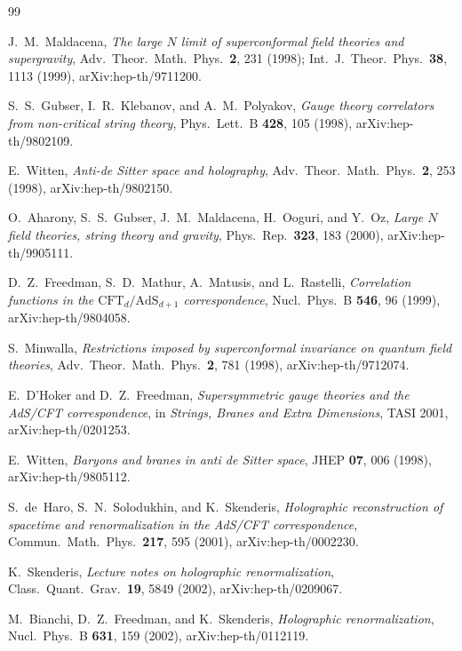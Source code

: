 \documentclass[
  aps,
  prd,
  preprint,
  groupedaddress,
  nofootinbib,
  longbibliography
]{revtex4-2}
\theoremstyle{remark}
\newcommand{\AdS}{\mathrm{AdS}}
\newcommand{\CFT}{\mathrm{CFT}}
\begin{document}
\begin{thebibliography}{99}

J.~M.~Maldacena,
\textit{The large $N$ limit of superconformal field theories and supergravity},
Adv.\ Theor.\ Math.\ Phys.\ \textbf{2}, 231 (1998);
Int.\ J.\ Theor.\ Phys.\ \textbf{38}, 1113 (1999),
arXiv:hep-th/9711200.

S.~S.~Gubser, I.~R.~Klebanov, and A.~M.~Polyakov,
\textit{Gauge theory correlators from non-critical string theory},
Phys.\ Lett.\ B \textbf{428}, 105 (1998),
arXiv:hep-th/9802109.

E.~Witten,
\textit{Anti-de Sitter space and holography},
Adv.\ Theor.\ Math.\ Phys.\ \textbf{2}, 253 (1998),
arXiv:hep-th/9802150.

O.~Aharony, S.~S.~Gubser, J.~M.~Maldacena, H.~Ooguri, and Y.~Oz,
\textit{Large $N$ field theories, string theory and gravity},
Phys.\ Rep.\ \textbf{323}, 183 (2000),
arXiv:hep-th/9905111.

D.~Z.~Freedman, S.~D.~Mathur, A.~Matusis, and L.~Rastelli,
\textit{Correlation functions in the $\CFT_d/\AdS_{d+1}$ correspondence},
Nucl.\ Phys.\ B \textbf{546}, 96 (1999),
arXiv:hep-th/9804058.

S.~Minwalla,
\textit{Restrictions imposed by superconformal invariance on quantum field theories},
Adv.\ Theor.\ Math.\ Phys.\ \textbf{2}, 781 (1998),
arXiv:hep-th/9712074.

E.~D'Hoker and D.~Z.~Freedman,
\textit{Supersymmetric gauge theories and the AdS/CFT correspondence},
in \textit{Strings, Branes and Extra Dimensions}, TASI 2001,
arXiv:hep-th/0201253.

E.~Witten,
\textit{Baryons and branes in anti de Sitter space},
JHEP \textbf{07}, 006 (1998),
arXiv:hep-th/9805112.

S.~de~Haro, S.~N.~Solodukhin, and K.~Skenderis,
\textit{Holographic reconstruction of spacetime and renormalization in the AdS/CFT correspondence},
Commun.\ Math.\ Phys.\ \textbf{217}, 595 (2001),
arXiv:hep-th/0002230.

K.~Skenderis,
\textit{Lecture notes on holographic renormalization},
Class.\ Quant.\ Grav.\ \textbf{19}, 5849 (2002),
arXiv:hep-th/0209067.

M.~Bianchi, D.~Z.~Freedman, and K.~Skenderis,
\textit{Holographic renormalization},
Nucl.\ Phys.\ B \textbf{631}, 159 (2002),
arXiv:hep-th/0112119.


\end{thebibliography}
\end{document}
